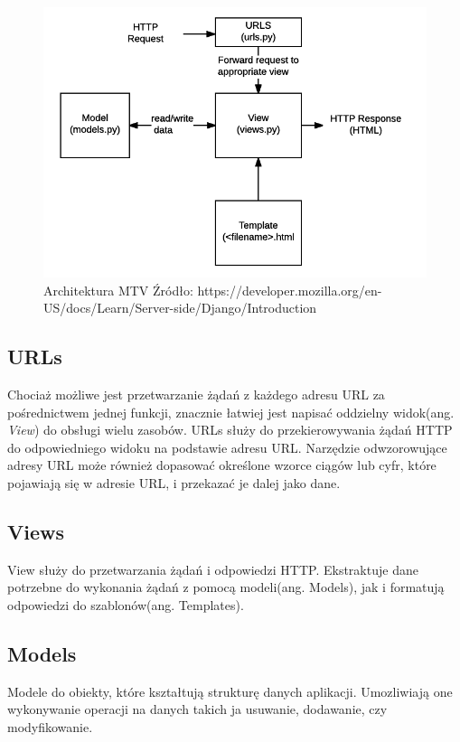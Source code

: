 \documentclass[oneside,polski,logo,indent]{amuthesis}
\begin{document}
\begin{enumerate}
\begin{enumerate}
\begin{figure}[H]
\centering
\includegraphics[width=14cm]{mtv.png}
\caption{Architektura MTV\newline
Źródło: https://developer.mozilla.org/en-US/docs/Learn/Server-side/Django/Introduction}
\label{MTV}
\end{figure}

\begin{center}
\subsection{URLs}
\end{center}
Chociaż możliwe jest przetwarzanie żądań z każdego adresu URL za pośrednictwem jednej funkcji, znacznie łatwiej jest napisać oddzielny widok(ang. \emph{View}) do obsługi wielu zasobów. URLs służy do przekierowywania żądań HTTP do odpowiedniego widoku na podstawie adresu URL. Narzędzie odwzorowujące adresy URL może również dopasować określone wzorce ciągów lub cyfr, które pojawiają się w adresie URL, i przekazać je dalej jako dane.


\begin{center}
\subsection{Views}
\end{center}
View służy do przetwarzania żądań i odpowiedzi HTTP. Ekstraktuje dane potrzebne do wykonania żądań z pomocą modeli(ang. Models), jak i formatują odpowiedzi do szablonów(ang. Templates).


\begin{center}
\subsection{Models}
\end{center}
Modele do obiekty, które kształtują strukturę danych aplikacji. Umozliwiają one wykonywanie operacji na danych takich ja usuwanie, dodawanie, czy modyfikowanie.



\end{enumerate}
\end{enumerate}
\end{document}
